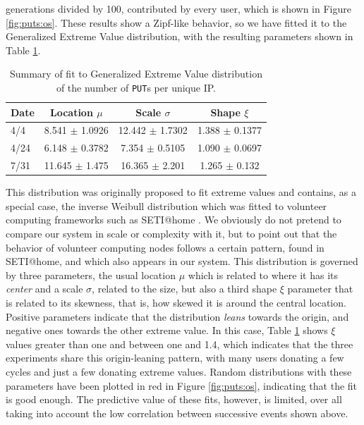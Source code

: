 \documentclass[journal,onecolumn]{IEEEtran}
\begin{document}
generations divided by 100, contributed by every user, which is shown
in Figure \ref{fig:puts:os}. These results show a Zipf-like behavior,
so we have fitted it to the Generalized Extreme Value distribution,
with the resulting parameters shown in Table \ref{tab:puts:os}.
%
\begin{table}
\caption{Summary of fit to Generalized Extreme Value distribution of
  the number of {\tt PUT}s per unique IP. \label{tab:puts:os}}
\begin{center}
\begin{tabular}{l|ccc}
\hline
Date  & Location $\mu$ & Scale $\sigma$ & Shape $\xi$ \\
\hline
4/4 &  8.541 $\pm$ 1.0926  &    12.442 $\pm$ 1.7302 &  1.388 $\pm$
0.1377 \\
4/24 & 6.148 $\pm$ 0.3782 & 7.354 $\pm$ 0.5105 & 1.090 $\pm$  0.0697  \\
7/31 & 11.645 $\pm$ 1.475 & 16.365 $\pm$ 2.201 &  1.265 $\pm$ 0.132   \\
\hline
\end{tabular}
\end{center}
\end{table}
%
This distribution was originally proposed to fit extreme values
\cite{resnick2013extreme} and contains, as a special case, the inverse
Weibull distribution which was fitted to volunteer computing
frameworks such as SETI@home \cite{javadi2009mining}. We obviously do
not pretend to compare our system in scale or complexity with it, but
to point out that the behavior of volunteer computing nodes follows a
certain pattern, found in SETI@home, and which also appears in our system. This
distribution is governed by three parameters, the usual location $\mu$
which is related to where it has its {\em center} and a scale $\sigma$,
related to the size, but also a third shape $\xi$ parameter that is
related to its skewness, that is, how skewed it is around the central
location. Positive parameters indicate that the distribution {\em
  leans} towards the origin, and negative ones towards the other extreme
value. In this case, Table \ref{tab:puts:os} shows $\xi$ values
greater than one and between one and 1.4, which indicates that the
three experiments share this origin-leaning pattern, with many users
donating a few cycles and just a few donating extreme values. Random
distributions with these parameters have been plotted in red in
Figure \ref{fig:puts:os}, indicating that the fit is good enough. The
predictive value of these fits, however, is limited, over all taking
into account the low correlation between successive events shown
above.
\end{document}
